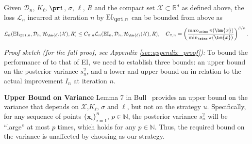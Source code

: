 \begin{theorem} \label{th1}
Given $\mathcal{D}_n$, $K_{\bm{\ell}}$, $\pri$, $\sigma$, ${\bm{\ell}}$, $R$ and the compact set $\mathcal{X}\subset\mathbb{R}^d$ as defined above, the loss $\mathcal{L}_{n}$ incurred at iteration $n$ by $\text{EI}_{\pri, n}$
can be bounded from above as
\begin{equation}
    \mathcal{L}_{n}(\text{EI}_{\pri, n}, \mathcal{D}_n, \mathcal{H}_{\bm{\ell}}(\mathcal{X}), R) \leq C_{\pi, n} \mathcal{L}_{n}(\text{EI}_n, \mathcal{D}_n, \mathcal{H}_{\bm{\ell}}(\mathcal{X}), R), \quad C_{\pi, n} = \left(\frac{\max_{\xinx} \pi(\bm{x})}{\min_{\xinx} \pi(\bm{x})}\right)^{\beta/n}.
\end{equation}
\end{theorem}  
\textit{Proof sketch (for the full proof, see Appendix \ref{sec:appendix_proof}):} 
To bound the performance of \pei{} to that of EI, we need to establish three bounds: an upper bound on the posterior variance $s_n^2$, and a lower and upper bound on \pei{} in relation to the actual improvement  $I_n$ at iteration $n$. 

\textbf{Upper Bound on Variance}\quad
Lemma 7 in Bull~\citep{JMLR:v12:bull11a} provides an upper bound on the variance that depends on $\mathcal{X}$,$K_{\bm{\ell}}$, $\sigma$ and ${\bm{\ell}}$, but not on the strategy $u$. Specifically, for any sequence of points $\{\bm{x}_i\}_{i=1}^n$, $p \in \mathbb{N}$, the posterior variance $s^2_n$ 
will be ``large'' at most $p$ times, which holds for any $p\in \mathbb{N}$. 
Thus, the required bound on the variance is unaffected by choosing \pei{} as our strategy.

